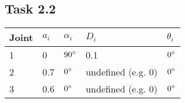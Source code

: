 \subsection*{Task 2.2}
\begin{center}
	\begin{tabular}{ | l | l | l | l | l |}
		\hline
		Joint & $a_{i}$ & $\alpha_{i}$ & $D_i$ & $\theta_i$ \\ \hline
		1 & 0 & $90\degree$ & 0.1 & $0\degree$\\ \hline
		2 & 0.7 & $0\degree$ & undefined (e.g. 0) & $0\degree$\\ \hline
		3 & 0.6 & $0\degree$ & undefined (e.g. 0) & $0\degree$\\ \hline
	\end{tabular}
\end{center}